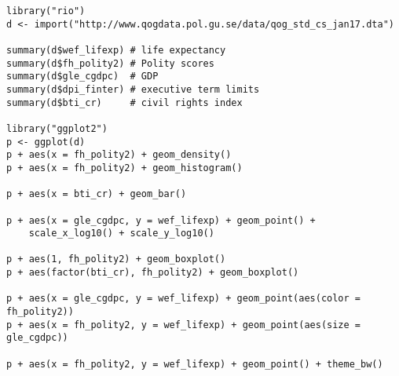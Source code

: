 \documentclass[17pt]{beamer} %
\begin{document}
\frame{}


\appendix

\begin{frame}[fragile]

\tiny

\begin{verbatim}
library("rio")
d <- import("http://www.qogdata.pol.gu.se/data/qog_std_cs_jan17.dta")

summary(d$wef_lifexp) # life expectancy
summary(d$fh_polity2) # Polity scores
summary(d$gle_cgdpc)  # GDP
summary(d$dpi_finter) # executive term limits
summary(d$bti_cr)     # civil rights index

library("ggplot2")
p <- ggplot(d)
p + aes(x = fh_polity2) + geom_density()
p + aes(x = fh_polity2) + geom_histogram()

p + aes(x = bti_cr) + geom_bar()

p + aes(x = gle_cgdpc, y = wef_lifexp) + geom_point() + 
    scale_x_log10() + scale_y_log10()

p + aes(1, fh_polity2) + geom_boxplot()
p + aes(factor(bti_cr), fh_polity2) + geom_boxplot()

p + aes(x = gle_cgdpc, y = wef_lifexp) + geom_point(aes(color = fh_polity2))
p + aes(x = fh_polity2, y = wef_lifexp) + geom_point(aes(size = gle_cgdpc))

p + aes(x = fh_polity2, y = wef_lifexp) + geom_point() + theme_bw()
\end{verbatim}

\end{frame}




\end{document}
